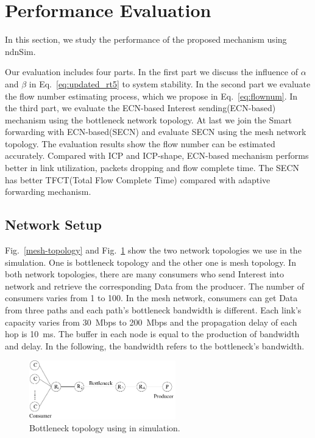 
\section{Performance Evaluation}

\label{sec:simulation}

In this section, we study the performance of the proposed mechanism using ndnSim\cite{ndnsimnet, ndnsim}.

Our evaluation includes four parts. In the first part we discuss the influence of $\alpha$ and $\beta$ in Eq.~\ref{eq:updated_rt5} to system stability. In the second part we evaluate the flow number estimating process, which we propose in Eq.~\ref{eq:flownum}. In the third part, we evaluate the ECN-based Interest sending(ECN-based) mechanism using the bottleneck network topology. At last we join the Smart forwarding with ECN-based(SECN) and evaluate SECN using the mesh network topology. The evaluation results show the flow number can be estimated accurately. Compared with ICP and ICP-shape, ECN-based mechanism performs better in link utilization, packets dropping and flow complete time. The SECN has better TFCT(Total Flow Complete Time) compared with adaptive forwarding mechanism.

\subsection{Network Setup}
Fig.~\ref{mesh-topology} and Fig.~\ref{bottleneck-topology} show the two network topologies we use in the simulation. One is bottleneck topology and the other one is mesh topology. In both network topologies, there are many consumers who send Interest into network and retrieve the corresponding Data from the producer. The number of consumers varies from 1 to 100. In the mesh network, consumers can get Data from three paths and each path's bottleneck bandwidth is different. Each link's capacity varies from 30~Mbps to 200~Mbps and the propagation delay of each hop is 10~ms. The buffer in each node is equal to the production of bandwidth and delay. In the following, the bandwidth refers to the bottleneck's bandwidth.

\begin{figure}[t]
\centering
\includegraphics[width=2.5in]{bottleneck-topology.pdf}
\caption{Bottleneck topology using in simulation.}
\label{bottleneck-topology}
\end{figure}

